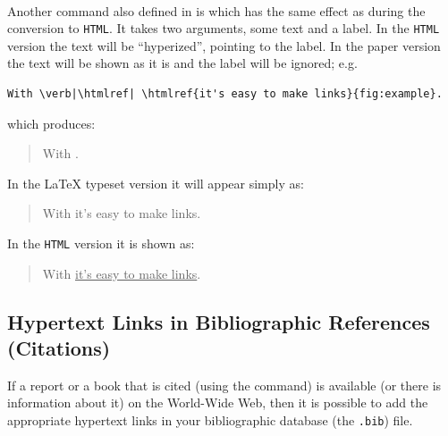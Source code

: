 \paragraph*{\label{htmlref}}
Another command also defined in  is  
which has the same effect as 
during the conversion to \texttt{HTML}.
It takes two arguments, some text and a label. 
In the \texttt{HTML} version the
text will be ``hyperized'', pointing to the label. 
In the paper version the text will be shown as it is 
and the label will be ignored; e.g.
%
%
\begin{small}
\begin{verbatim}
With \verb|\htmlref| \htmlref{it's easy to make links}{fig:example}.
\end{verbatim}
\end{small}
which produces:
\begin{quote}
With  .
\end{quote}
\begin{htmlonly}
In the \LaTeX{} typeset version it will appear simply as:
\begin{quote}
With  it's easy to make links.
\end{quote}
\end{htmlonly}
\begin{latexonly}
In the \texttt{HTML} version it is shown as:
\begin{quote}
With  \underline{it's easy to make links}.
\end{quote}
\end{latexonly}
\html{\\}
\goodbreak

\subsection{Hypertext Links in Bibliographic References (Citations)}%
\tableofchildlinks*
{}%
%
\html{\\}%
If a report or a book that is cited (using the  command) 
is available (or there is information about it) on the World-Wide
Web, then it is possible to add the appropriate hypertext links
in your bibliographic database (the \texttt{.bib}) file. 

